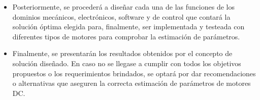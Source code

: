 \begin{itemize}
            \item Posteriormente, se procederá a diseñar cada una de las funciones de los dominios mecánicos, electrónicos, software y de control que contará la solución óptima elegida para, finalmente, ser implementada y testeada con diferentes tipos de motores para comprobar la estimación de parámetros.
            
            \item Finalmente, se presentarán los resultados obtenidos por el concepto de solución diseñado. En caso no se llegase a cumplir con todos los objetivos propuestos o los requerimientos brindados, se optará por dar recomendaciones o alternativas que aseguren la correcta estimación de parámetros de motores \ac{DC}.
        \end{itemize}
    
    
    